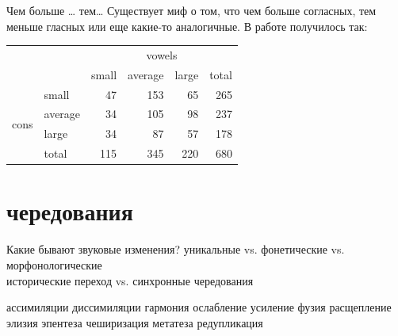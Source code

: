 \begin{frame}{Чем больше … тем…}
Существует миф о том, что чем больше согласных, тем меньше гласных или еще какие-то аналогичные. В работе \citep{maddieson10} получилось так: \medskip\\
\begin{tabular}{|l|l|r|r|r|r|}
\hline
 \multicolumn{2}{|c|}{}  & \multicolumn{4}{c|}{vowels} \\ \cline{3-6}
 \multicolumn{2}{|c|}{}  & \multicolumn{1}{l|}{small} & \multicolumn{1}{l|}{average} & \multicolumn{1}{l|}{large} & \multicolumn{1}{l|}{total} \\ \hline
\multirow{4}[0]{*}{cons} & small & 47 & 153 & 65 & 265 \\ \cline{2-6}
 & average & 34 & 105 & 98 & 237 \\ \cline{2-6}
 & large & 34 & 87 & 57 & 178 \\ \cline{2-6}
 & total & 115 & 345 & 220 & 680 \\ \hline
\end{tabular}
\end{frame}

\section{чередования}
\begin{frame}{Какие бывают звуковые изменения?}
уникальные vs. фонетические vs. морфонологические\\
исторические переход vs. синхронные чередования\\
\vfill
\begin{multicols}{2}
\begin{itemize}
\mytem ассимиляции
\mytem диссимиляции
\mytem гармония
\mytem ослабление
\mytem усиление
\mytem фузия
\mytem расщепление
\mytem элизия
\mytem эпентеза
\mytem чеширизация
\mytem метатеза
\mytem редупликация
\end{itemize}
\end{multicols}
\end{frame}

